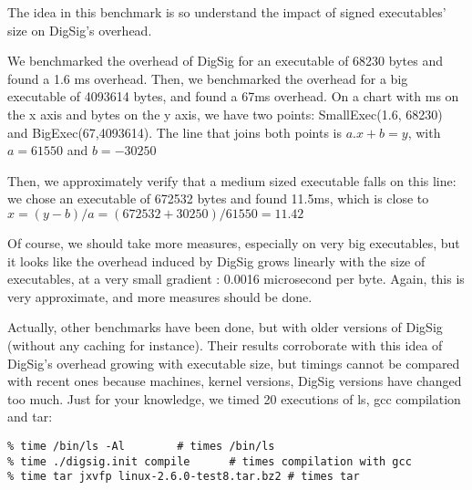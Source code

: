 \documentclass{article}
\begin{document}
The idea in this benchmark is so understand the impact of signed 
executables' size on DigSig's overhead.

We benchmarked the overhead of DigSig for an executable of 68230 bytes
and found a 1.6 ms overhead. Then, we benchmarked the overhead for a big
executable of 4093614 bytes, and found a 67ms overhead. On a chart with
ms on the x axis and bytes on the y axis, we have two points: 
SmallExec(1.6, 68230) and BigExec(67,4093614). The line that joins both
points is $a.x + b = y$, with $a=61550$ and $b=-30250$

Then, we approximately verify that a medium sized executable falls on this
line: we chose an executable of 672532 bytes and found 11.5ms, which is close
to $x = (y-b)/a = (672532+30250)/61550 = 11.42$

Of course, we should take more measures, especially on very big executables, but
it looks like the overhead induced by DigSig grows linearly with the size
of executables, at a very small gradient : 0.0016 microsecond per byte.
Again, this is very approximate, and more measures should be done.

Actually, other benchmarks have been done, but with older versions of DigSig (without
any caching for instance). Their results corroborate with this idea of DigSig's
overhead growing with executable size, but timings cannot be compared with recent
ones because machines, kernel versions, DigSig versions have changed too much.
Just for your knowledge, we timed 20 executions of ls, gcc compilation and tar:


\small
\begin{verbatim} 
% time /bin/ls -Al		  # times /bin/ls
% time ./digsig.init compile      # times compilation with gcc
% time tar jxvfp linux-2.6.0-test8.tar.bz2 # times tar
\end{verbatim} 
\normalsize
\end{document}
